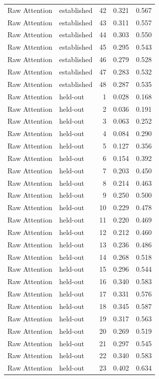 \begin{tabular}{llrrr}
Raw Attention & established & 42 & 0.321 & 0.567 \\
Raw Attention & established & 43 & 0.311 & 0.557 \\
Raw Attention & established & 44 & 0.303 & 0.550 \\
Raw Attention & established & 45 & 0.295 & 0.543 \\
Raw Attention & established & 46 & 0.279 & 0.528 \\
Raw Attention & established & 47 & 0.283 & 0.532 \\
Raw Attention & established & 48 & 0.287 & 0.535 \\
Raw Attention & held-out & 1 & 0.028 & 0.168 \\
Raw Attention & held-out & 2 & 0.036 & 0.191 \\
Raw Attention & held-out & 3 & 0.063 & 0.252 \\
Raw Attention & held-out & 4 & 0.084 & 0.290 \\
Raw Attention & held-out & 5 & 0.127 & 0.356 \\
Raw Attention & held-out & 6 & 0.154 & 0.392 \\
Raw Attention & held-out & 7 & 0.203 & 0.450 \\
Raw Attention & held-out & 8 & 0.214 & 0.463 \\
Raw Attention & held-out & 9 & 0.250 & 0.500 \\
Raw Attention & held-out & 10 & 0.229 & 0.478 \\
Raw Attention & held-out & 11 & 0.220 & 0.469 \\
Raw Attention & held-out & 12 & 0.212 & 0.460 \\
Raw Attention & held-out & 13 & 0.236 & 0.486 \\
Raw Attention & held-out & 14 & 0.268 & 0.518 \\
Raw Attention & held-out & 15 & 0.296 & 0.544 \\
Raw Attention & held-out & 16 & 0.340 & 0.583 \\
Raw Attention & held-out & 17 & 0.331 & 0.576 \\
Raw Attention & held-out & 18 & 0.345 & 0.587 \\
Raw Attention & held-out & 19 & 0.317 & 0.563 \\
Raw Attention & held-out & 20 & 0.269 & 0.519 \\
Raw Attention & held-out & 21 & 0.297 & 0.545 \\
Raw Attention & held-out & 22 & 0.340 & 0.583 \\
Raw Attention & held-out & 23 & 0.402 & 0.634 \\

\end{tabular}
